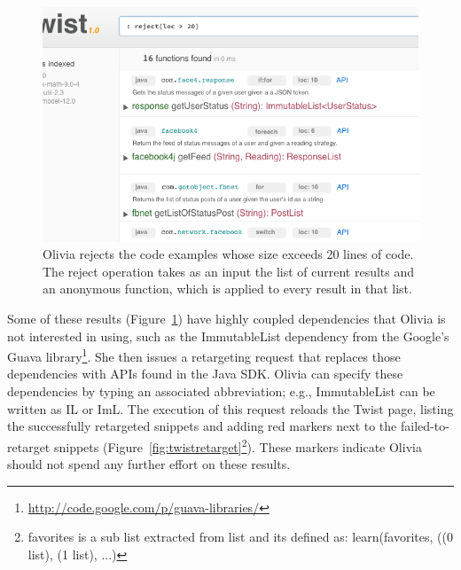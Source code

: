 \begin{figure}[!ht]
    \centering
    \includegraphics[width=\textwidth]{images/twistslash}
    \caption{Olivia rejects the code examples whose size exceeds 20 lines of code. The 
	 reject operation takes as an input the list of current results and an anonymous function, 
	 which is applied to every result in that list.}
    \label{fig:twistslash}
\end{figure}  

Some of these results (Figure~\ref{fig:twistslash}) have highly coupled dependencies that Olivia is not interested in using, such as the ImmutableList dependency from the Google's Guava library\footnote{\url{http://code.google.com/p/guava-libraries/}}. She then issues a retargeting request that replaces those dependencies with APIs found in the Java SDK. Olivia can specify these dependencies by typing an associated abbreviation; e.g., ImmutableList can be written as IL or ImL. The execution of this request reloads the Twist page, listing the successfully retargeted snippets and adding red markers next to the failed-to-retarget snippets (Figure~\ref{fig:twistretarget}\footnote{favorites is a sub list extracted from list and its defined as: learn(favorites, ((0 list), (1 list), ...)}). These markers indicate Olivia should not spend any further effort on these results. 

